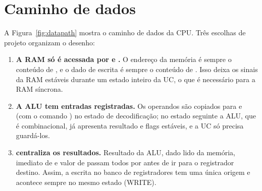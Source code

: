 \section{Caminho de dados}
\label{sec:datapath}

A Figura~\ref{fig:datapath} mostra o caminho de dados da CPU. Três escolhas de
projeto organizam o desenho:

\begin{enumerate}[nosep]
  \item \textbf{A RAM só é acessada por  e .} O endereço da
        memória é sempre o conteúdo de , e o dado de escrita é sempre o
        conteúdo de . Isso deixa os sinais da RAM estáveis durante um
        estado inteiro da UC, o que é necessário para a RAM síncrona.
  \item \textbf{A ALU tem entradas registradas.} Os operandos são copiados para
         e  (com o comando ) no estado de
        decodificação; no estado seguinte a ALU, que é combinacional, já
        apresenta resultado e flags estáveis, e a UC só precisa guardá-los.
  \item \textbf{ centraliza os resultados.} Resultado da ALU, dado lido
        da memória, imediato de  e valor de  passam todos
        por  antes de ir para o registrador destino. Assim, a escrita
        no banco de registradores tem uma única origem e acontece sempre no
        mesmo estado (WRITE).
\end{enumerate}

